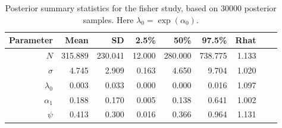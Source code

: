 \begin{table}
\caption{
Posterior summary statistics for the fisher study, based on 30000
posterior samples. Here $\lambda_{0} = \exp(\alpha_{0})$.
}
\begin{tabular}{rrrrrrrrr}\hline \hline
Parameter   &   Mean  &   SD  &   2.5\%  &    50\%  &   97.5\%  &  Rhat    \\ \hline
$N$         & 315.889 & 230.041 &  12.000  & 280.000  & 738.775   &  1.133    \\
$\sigma$    &   4.745 &   2.909 &   0.163  &   4.650  &   9.704   &  1.020    \\
$\lambda_0$ &   0.003 &   0.033 &   0.000  &   0.000  &   0.016   &  1.097    \\ 
$\alpha_1$  &  0.188  &   0.170 &   0.005  &   0.138  &   0.641   &  1.002    \\ 
$\psi$      &   0.413 &   0.300 &   0.016  &   0.366  &   0.964   & 1.131    \\  \hline
\end{tabular}
\label{searchencounter.table.fisher}
\end{table}


